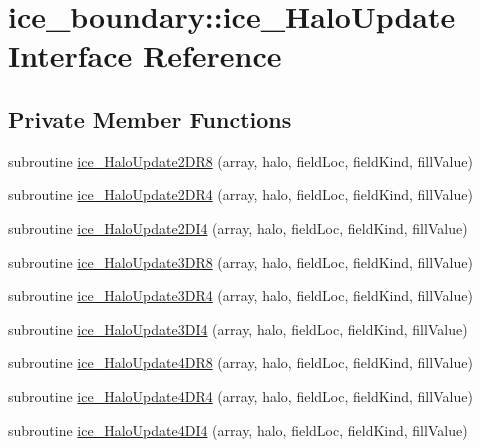 \hypertarget{interfaceice__boundary_1_1ice__HaloUpdate}{
\section{ice\_\-boundary::ice\_\-HaloUpdate Interface Reference}
\label{interfaceice__boundary_1_1ice__HaloUpdate}
}
\subsection*{Private Member Functions}
\begin{DoxyCompactItemize}
\item 
subroutine \hyperlink{interfaceice__boundary_1_1ice__HaloUpdate_a82dea76fd78278fc545d3faf6bced380}{ice\_\-HaloUpdate2DR8} (array, halo, fieldLoc, fieldKind, fillValue)
\item 
subroutine \hyperlink{interfaceice__boundary_1_1ice__HaloUpdate_a6e0330dfb47b323f627d0794a8ce828e}{ice\_\-HaloUpdate2DR4} (array, halo, fieldLoc, fieldKind, fillValue)
\item 
subroutine \hyperlink{interfaceice__boundary_1_1ice__HaloUpdate_ac6180f0c3cd53da8017c494719f21f3e}{ice\_\-HaloUpdate2DI4} (array, halo, fieldLoc, fieldKind, fillValue)
\item 
subroutine \hyperlink{interfaceice__boundary_1_1ice__HaloUpdate_a51bf55a574af1fb833d88d67aa6bee2e}{ice\_\-HaloUpdate3DR8} (array, halo, fieldLoc, fieldKind, fillValue)
\item 
subroutine \hyperlink{interfaceice__boundary_1_1ice__HaloUpdate_a11cc4970931ed0152cd3bb0dd69be05d}{ice\_\-HaloUpdate3DR4} (array, halo, fieldLoc, fieldKind, fillValue)
\item 
subroutine \hyperlink{interfaceice__boundary_1_1ice__HaloUpdate_aa7d77351c8f404017ba32791c035fc5a}{ice\_\-HaloUpdate3DI4} (array, halo, fieldLoc, fieldKind, fillValue)
\item 
subroutine \hyperlink{interfaceice__boundary_1_1ice__HaloUpdate_a34a986dcf143947fde5f9cc909e1a626}{ice\_\-HaloUpdate4DR8} (array, halo, fieldLoc, fieldKind, fillValue)
\item 
subroutine \hyperlink{interfaceice__boundary_1_1ice__HaloUpdate_a8469112a061e0bb25dbdb7976cbf67de}{ice\_\-HaloUpdate4DR4} (array, halo, fieldLoc, fieldKind, fillValue)
\item 
subroutine \hyperlink{interfaceice__boundary_1_1ice__HaloUpdate_aae1cfde7b6634aa39f25bb988a485b70}{ice\_\-HaloUpdate4DI4} (array, halo, fieldLoc, fieldKind, fillValue)
\end{DoxyCompactItemize}


